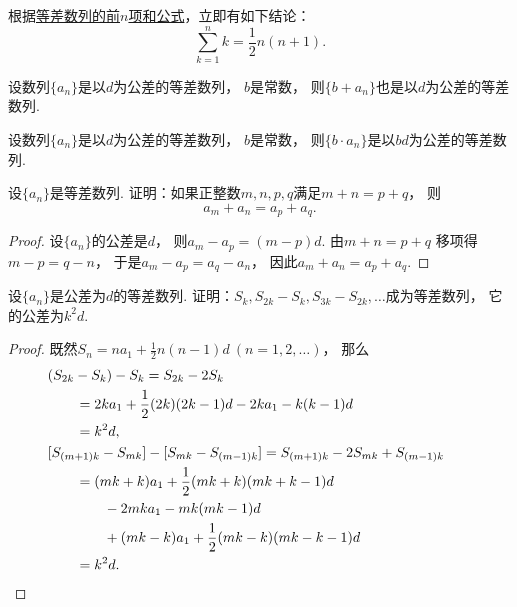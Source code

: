 根据\hyperref[equation:数列.等差数列的前n项和1]{等差数列的前\(n\)项和公式}，立即有如下结论：
\begin{equation}
    \sum_{k=1}^n k = \frac{1}{2} n(n+1).
\end{equation}

\begin{property}
设数列\(\{a_n\}\)是以\(d\)为公差的等差数列，
\(b\)是常数，
则\(\{b + a_n\}\)也是以\(d\)为公差的等差数列.
\end{property}

\begin{property}
设数列\(\{a_n\}\)是以\(d\)为公差的等差数列，
\(b\)是常数，
则\(\{b \cdot a_n\}\)是以\(b d\)为公差的等差数列.
\end{property}

\begin{example}
设\(\{a_n\}\)是等差数列.
证明：如果正整数\(m,n,p,q\)满足\(m+n=p+q\)，
则\begin{equation*}
	a_m+a_n=a_p+a_q.
\end{equation*}
\begin{proof}
设\(\{a_n\}\)的公差是\(d\)，
则\(a_m-a_p = (m-p)d\).
由\(m+n=p+q\)
移项得\(m-p=q-n\)，
于是\(a_m-a_p = a_q-a_n\)，
因此\(a_m+a_n=a_p+a_q\).
\end{proof}
\end{example}

\begin{example}
设\(\{a_n\}\)是公差为\(d\)的等差数列.
证明：\(S_k,S_{2k}-S_k,S_{3k}-S_{2k},\dotsc\)成为等差数列，
它的公差为\(k^2 d\).
\begin{proof}
既然\(S_n = n a_1 + \frac12 n(n-1) d\ (n=1,2,\dotsc)\)，
那么\begin{align*}
	&\hspace{-20pt}
	(S_{2k}-S_k) - S_k
	= S_{2k} - 2 S_k \\
	&= 2k a_1 + \frac12 (2k)(2k-1) d
	- 2 k a_1 - k(k-1) d \\
	&= k^2 d, \\
	&\hspace{-20pt}
	[S_{(m+1)k}-S_{mk}] - [S_{mk}-S_{(m-1)k}]
	= S_{(m+1)k} - 2 S_{mk} + S_{(m-1)k} \\
	&= (mk+k) a_1 + \frac12 (mk+k)(mk+k-1) d \\
	&\hspace{20pt}
	- 2 mk a_1 - mk (mk-1) d \\
	&\hspace{20pt}
	+ (mk-k) a_1 + \frac12 (mk-k)(mk-k-1) d \\
	&= k^2 d.
	\qedhere
\end{align*}
\end{proof}
\end{example}

